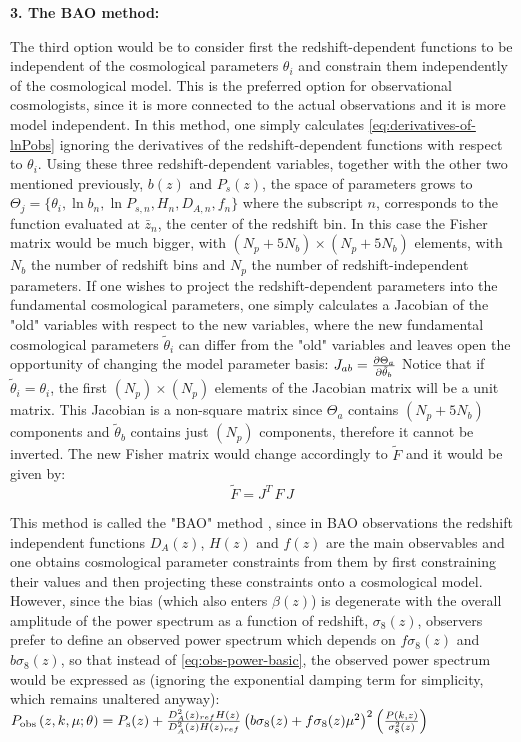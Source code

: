 \textbf{3. The BAO method:}

The third option would be to consider first the redshift-dependent functions to be independent of the cosmological
parameters $\theta_i$ and constrain them independently of the cosmological model.
This is the preferred option for observational cosmologists, since 
it is more connected to the actual observations and it is more model independent.
In this method, one simply calculates \cref{eq:derivatives-of-lnPobs} ignoring the derivatives
of the redshift-dependent functions with respect to $\theta_i$.
Using these three redshift-dependent variables, together with the other two mentioned previously, $b(z)$
and $P_s(z)$, the space of parameters grows to
\beeqc$
 \Theta_j = \{ \theta_i, \ln b_{n}, \ln P_{s,n}, H_n, D_{A,n}, f_n \}
$
where the subscript $n$, corresponds to the function evaluated at $\bar{z}_n$, the center of the redshift bin.
In this case the Fisher matrix would be much bigger, with
$(N_p + 5 N_b) \times (N_p + 5 N_b)$ elements,  with $N_b$ the number of redshift bins 
and $N_p$ the number of redshift-independent parameters.
If one wishes to project the redshift-dependent parameters into the fundamental cosmological
parameters, one simply calculates a Jacobian of the "old" variables with respect to the new variables, 
where the new fundamental cosmological parameters $\tilde{\theta}_i$ can differ from the "old"
variables and leaves open the opportunity of changing the model parameter basis:
\beeqp$
J_{a b} = \frac{\partial{\Theta_a}}{\partial{\tilde{\theta}_b}}
$
Notice that if $\tilde{\theta}_i = \theta_i$, the first $(N_p) \times (N_p)$ elements 
of the Jacobian matrix will be a unit matrix. 
This Jacobian is a non-square matrix since $\Theta_a$ contains $ (N_p + 5 N_b)$ components and
$\tilde{\theta}_b$ contains just $ (N_p)$ components,
therefore it cannot be inverted.
The new Fisher matrix would change accordingly to $\tilde F$ and it would be given by:
\begin{equation}
\tilde F = J^{T}\, F \,J
\end{equation}

This method is called the "BAO" method \cite{seo_improved_2007, seo_improved_2005}, since in BAO observations
the redshift independent functions $D_{A}(z)$, $H(z)$ and $f(z)$ are the main observables and
one obtains cosmological parameter constraints from them by first constraining their values 
and then projecting these constraints onto a cosmological model. 
However, since the bias (which also enters $\beta(z)$) is degenerate with the
overall amplitude of the power spectrum as a function of redshift, $\sigma_8 (z)$, observers prefer to define an observed power spectrum
which depends on $f\sigma_{8}(z)$ and $b \sigma_{8}(z)$, so that instead of \cref{eq:obs-power-basic}, the observed power spectrum would be expressed as
(ignoring the exponential damping term for simplicity, which remains unaltered anyway):
\beeqp$\label{eq:obs-power-fs8}
P_{{\rm obs}}\left(z,k,\mu;\theta\right)=P_{{\rm s}}(z)+\frac{D_{A}^{2}(z)_{ref}H(z)}{D_{A}^{2}(z)H(z)_{ref}}
\left(b\sigma_{8}(z)+f\sigma_{8}(z)\mu^{2}\right)^{2} \left(\frac{P(k,z)}{\sigma_{8}^{2}(z)}\right)
$

